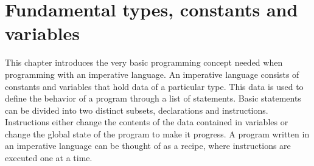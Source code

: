 \chapter{Fundamental types, constants and variables}
\nopagecolor{}
\label{chap:chap2}

This chapter introduces the very basic programming concept needed when
programming with an imperative language. An imperative language consists of
constants and variables that hold data of a particular type. This data is used
to define the behavior of a program through a list of statements. Basic
statements can be divided into two distinct subsets, declarations and
instructions. Instructions either change the contents of the data contained in
variables or change the global state of the program to make it progress. A
program written in an imperative language can be thought of as a recipe, where
instructions are executed one at a time.

\minitoc%










